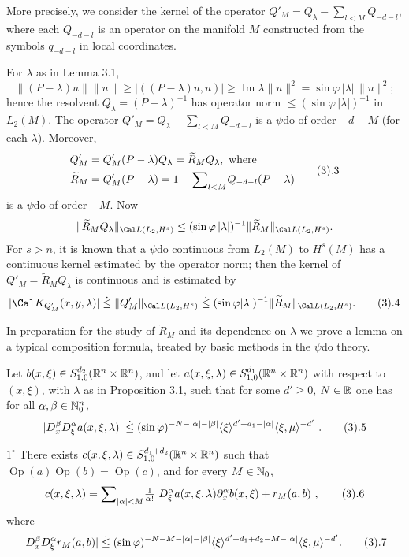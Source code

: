 More precisely, we consider the kernel of the
operator $Q'_M=Q_\lambda -\sum_{l<M}Q_{-d-l}$, where each $Q_{-d-l}$ is an
operator on the manifold $M$ constructed from the symbols $q_{-d-l}$
in local coordinates.

For $\lambda $ as in Lemma 3.1,
$$
\|(P-\lambda )u\| \|u\|\ge |((P-\lambda )u,u)|\ge \operatorname{Im}\lambda \|u\|^2=\sin\varphi \,|\lambda |\,\|u\|^2;
$$
hence the resolvent $Q_\lambda =(P-\lambda )^{-1}$ has operator norm
$\le (\sin\varphi \,|\lambda |)^{-1}$ in $L_2(M)$. The operator
$Q'_M=Q_\lambda -\sum_{l<M}Q_{-d-l}$ is a $\psi $do of order $-d-M$
(for each $\lambda $). Moreover,
$$
\aligned
Q'_M&=Q'_M(P-\lambda )Q_\lambda =\widetilde R_MQ_\lambda ,\text{ where
}\\
\widetilde R_M&=Q'_M(P-\lambda )=1-{\sum}_{l<M}Q_{-d-l}(P-\lambda )
\endaligned\tag3.3
$$
is a $\psi $do of order $-M$. Now
$$
\|\widetilde R_MQ_\lambda \|_{\Cal L(L_2, H^s)}\le (\sin\varphi \,|\lambda |)^{-1}\|\widetilde R_M\|_{\Cal L(L_2, H^s)}.
$$
For $s>n$, it is known that a $\psi $do continuous from $L_2(M)$ to
$H^s(M)$  has a continuous kernel estimated by the
operator norm; then
 the kernel of $Q'_M=\widetilde R_MQ_\lambda $ is continuous
and  is  estimated by
$$
|\Cal K_{Q'_M}(x,y,\lambda )|\leg \|Q'_M \|_{\Cal L(L_2, H^s)}\leg (\sin\varphi |\lambda |)^{-1}\|\widetilde R_M \|_{\Cal L(L_2, H^s)}.\tag3.4
$$

In preparation for the study of $\widetilde R_M$ and its dependence on
$\lambda $ we prove a lemma on a
typical composition
formula, treated by basic methods in the $\psi $do theory.



Let
$b(x,\xi ) \in
S^{d_2}_{1,0}({\Bbb R}^n\times{\Bbb R}^n)$, and let $a(x,\xi ,\lambda ) \in S^{d_1}_{1,0}({\Bbb R}^n\times{\Bbb R}^n)$
with respect to $(x,\xi )$, with $\lambda $ as in Proposition {\rm
3.1}, such that for some $d'\ge 0$, $N \in \Bbb R$ one has for all $\alpha ,\beta \in{\Bbb N}_0^n$,
$$
|D_x^\beta D_\xi ^\alpha a(x,\xi ,\lambda )|\leg
(\sin\varphi)^{-N-|\alpha|-|\beta|}\ang\xi^{d' + d_1-|\alpha|}
\ang{\xi ,\mu }^{-d'} \ .\tag3.5
$$

$1^\circ$ There exists $c (x,\xi ,\lambda ) \in S^{d_1+d_2}_{1,0}({\Bbb R}^n\times{\Bbb R}^n)$
such that $\operatorname{Op}(a) \operatorname{Op}(b) =
\operatorname{Op}(c)$, and for every $M \in{\Bbb N}_0$, %
$$
c(x,\xi ,\lambda ) = {\sum}_{|\alpha|<M} \tfrac{1}{\alpha!}\ D_\xi^\alpha
a(x,\xi ,\lambda )
\partial_x^\alpha b(x,\xi) + r_M(a,b) \ ,\tag3.6
$$
where
$$
|D_x^\beta D_\xi ^\alpha r_M(a,b)| \leg
(\sin\varphi)^{-N-M-|\alpha|-|\beta|}\ang\xi^{d'+d_1+d_2-M-|\alpha|}
\ang{\xi ,\mu }^{-d'}.\tag3.7
$$

